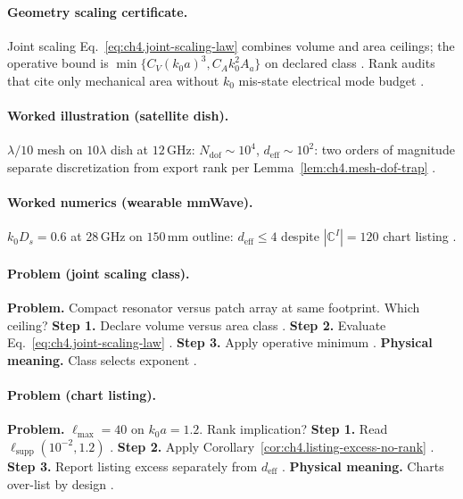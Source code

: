 \paragraph{Geometry scaling certificate.}
Joint scaling Eq.~\eqref{eq:ch4.joint-scaling-law} combines volume and area ceilings; the operative bound is
\(\min\{C_{V}(k_{0}a)^{3},C_{A}k_{0}^{2}A_{a}\}\) on declared class \cite{jackson1999,hansen1988,harrington2001,stratton1941,devaney2004,collin2001}.
Rank audits that cite only mechanical area without \(k_{0}\) mis-state electrical mode budget \cite{stratton1941,harrington2001}.

\paragraph{Worked illustration (satellite dish).}
\(\lambda/10\) mesh on \(10\lambda\) dish at \(12\,\mathrm{GHz}\): \(N_{\mathrm{dof}}\sim10^{4}\), \(d_{\mathrm{eff}}\sim10^{2}\): two orders of magnitude
separate discretization from export rank per Lemma~\ref{lem:ch4.mesh-dof-trap} \cite{harrington2001,hansen1988,jackson1999,devaney2004,collin2001}.

\paragraph{Worked numerics (wearable mmWave).}
\(k_{0}D_{s}=0.6\) at \(28\,\mathrm{GHz}\) on \(150\,\mathrm{mm}\) outline: \(d_{\mathrm{eff}}\le4\) despite \(|\mathbb{C}^{I}|=120\) chart listing
\cite{harrington2001,jackson1999,stratton1941,hansen1988,devaney2004}.

\paragraph{Problem (joint scaling class).}
\textbf{Problem.} Compact resonator versus patch array at same footprint. Which ceiling?
\textbf{Step 1.} Declare volume versus area class \cite{collin2001,stratton1941}.
\textbf{Step 2.} Evaluate Eq.~\eqref{eq:ch4.joint-scaling-law} \cite{jackson1999,hansen1988}.
\textbf{Step 3.} Apply operative minimum \cite{harrington2001,devaney2004}.
\textbf{Physical meaning.} Class selects exponent \cite{stratton1941}.

\paragraph{Problem (chart listing).}
\textbf{Problem.} \(\ell_{\max}=40\) on \(k_{0}a=1.2\). Rank implication?
\textbf{Step 1.} Read \(\ell_{\mathrm{supp}}(10^{-2},1.2)\) \cite{hansen1988,harrington2001}.
\textbf{Step 2.} Apply Corollary~\ref{cor:ch4.listing-excess-no-rank} \cite{stratton1941,devaney2004}.
\textbf{Step 3.} Report listing excess separately from \(d_{\mathrm{eff}}\) \cite{jackson1999,collin2001}.
\textbf{Physical meaning.} Charts over-list by design \cite{harrington2001}.


